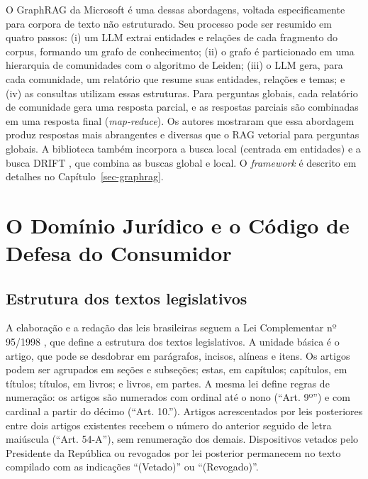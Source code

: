 O GraphRAG da Microsoft \cite{edge2024global} é uma dessas abordagens, voltada especificamente para corpora de texto não estruturado. Seu processo pode ser resumido em quatro passos: (i) um LLM extrai entidades e relações de cada fragmento do corpus, formando um grafo de conhecimento; (ii) o grafo é particionado em uma hierarquia de comunidades com o algoritmo de Leiden; (iii) o LLM gera, para cada comunidade, um relatório que resume suas entidades, relações e temas; e (iv) as consultas utilizam essas estruturas. Para perguntas globais, cada relatório de comunidade gera uma resposta parcial, e as respostas parciais são combinadas em uma resposta final (\textit{map-reduce}). Os autores mostraram que essa abordagem produz respostas mais abrangentes e diversas que o RAG vetorial para perguntas globais. A biblioteca também incorpora a busca local (centrada em entidades) e a busca DRIFT \cite{microsoft2024drift}, que combina as buscas global e local. O \textit{framework} é descrito em detalhes no Capítulo~\ref{sec-graphrag}.

\section{O Domínio Jurídico e o Código de Defesa do Consumidor}
\label{sec-referencial-juridico}

\subsection{Estrutura dos textos legislativos}
\label{sec-referencial-juridico-estrutura}

A elaboração e a redação das leis brasileiras seguem a Lei Complementar nº 95/1998 \cite{brasil1998lc95}, que define a estrutura dos textos legislativos. A unidade básica é o artigo, que pode se desdobrar em parágrafos, incisos, alíneas e itens. Os artigos podem ser agrupados em seções e subseções; estas, em capítulos; capítulos, em títulos; títulos, em livros; e livros, em partes. A mesma lei define regras de numeração: os artigos são numerados com ordinal até o nono (``Art. 9º'') e com cardinal a partir do décimo (``Art. 10.''). Artigos acrescentados por leis posteriores entre dois artigos existentes recebem o número do anterior seguido de letra maiúscula (``Art. 54-A''), sem renumeração dos demais. Dispositivos vetados pelo Presidente da República ou revogados por lei posterior permanecem no texto compilado com as indicações ``(Vetado)'' ou ``(Revogado)''.

